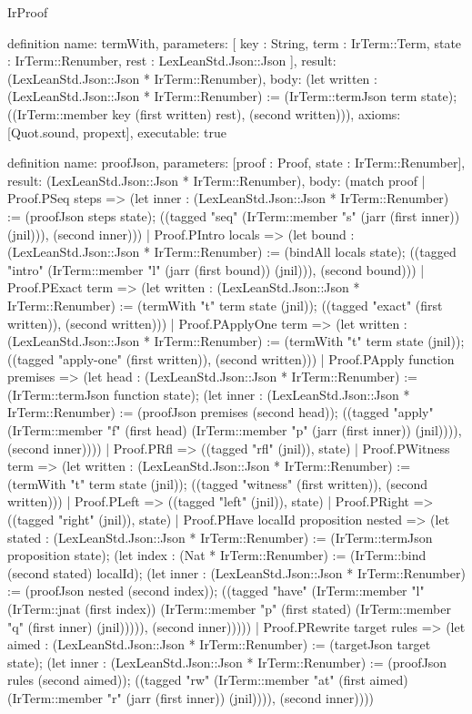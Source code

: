 \begin{lexlean}{IrProof}
\begin{semanticmodule}
definition{
  name: termWith,
  parameters: [
    key : String,
    term : IrTerm::Term,
    state : IrTerm::Renumber,
    rest : LexLeanStd.Json::Json
  ],
  result: (LexLeanStd.Json::Json * IrTerm::Renumber),
  body: (let written : (LexLeanStd.Json::Json * IrTerm::Renumber) := (IrTerm::termJson term state); ((IrTerm::member key (first written) rest), (second written))),
  axioms: [Quot.sound, propext],
  executable: true
}

definition{
  name: proofJson,
  parameters: [proof : Proof, state : IrTerm::Renumber],
  result: (LexLeanStd.Json::Json * IrTerm::Renumber),
  body: (match proof
    | Proof.PSeq steps => (let inner : (LexLeanStd.Json::Json * IrTerm::Renumber) := (proofJson steps state); ((tagged "seq" (IrTerm::member "s" (jarr (first inner)) (jnil))), (second inner)))
    | Proof.PIntro locals => (let bound : (LexLeanStd.Json::Json * IrTerm::Renumber) := (bindAll locals state); ((tagged "intro" (IrTerm::member "l" (jarr (first bound)) (jnil))), (second bound)))
    | Proof.PExact term => (let written : (LexLeanStd.Json::Json * IrTerm::Renumber) := (termWith "t" term state (jnil)); ((tagged "exact" (first written)), (second written)))
    | Proof.PApplyOne term => (let written : (LexLeanStd.Json::Json * IrTerm::Renumber) := (termWith "t" term state (jnil)); ((tagged "apply-one" (first written)), (second written)))
    | Proof.PApply function premises => (let head : (LexLeanStd.Json::Json * IrTerm::Renumber) := (IrTerm::termJson function state); (let inner : (LexLeanStd.Json::Json * IrTerm::Renumber) := (proofJson premises (second head)); ((tagged "apply" (IrTerm::member "f" (first head) (IrTerm::member "p" (jarr (first inner)) (jnil)))), (second inner))))
    | Proof.PRfl => ((tagged "rfl" (jnil)), state)
    | Proof.PWitness term => (let written : (LexLeanStd.Json::Json * IrTerm::Renumber) := (termWith "t" term state (jnil)); ((tagged "witness" (first written)), (second written)))
    | Proof.PLeft => ((tagged "left" (jnil)), state)
    | Proof.PRight => ((tagged "right" (jnil)), state)
    | Proof.PHave localId proposition nested => (let stated : (LexLeanStd.Json::Json * IrTerm::Renumber) := (IrTerm::termJson proposition state); (let index : (Nat * IrTerm::Renumber) := (IrTerm::bind (second stated) localId); (let inner : (LexLeanStd.Json::Json * IrTerm::Renumber) := (proofJson nested (second index)); ((tagged "have" (IrTerm::member "l" (IrTerm::jnat (first index)) (IrTerm::member "p" (first stated) (IrTerm::member "q" (first inner) (jnil))))), (second inner)))))
    | Proof.PRewrite target rules => (let aimed : (LexLeanStd.Json::Json * IrTerm::Renumber) := (targetJson target state); (let inner : (LexLeanStd.Json::Json * IrTerm::Renumber) := (proofJson rules (second aimed)); ((tagged "rw" (IrTerm::member "at" (first aimed) (IrTerm::member "r" (jarr (first inner)) (jnil)))), (second inner))))
}
\end{semanticmodule}
\end{lexlean}
